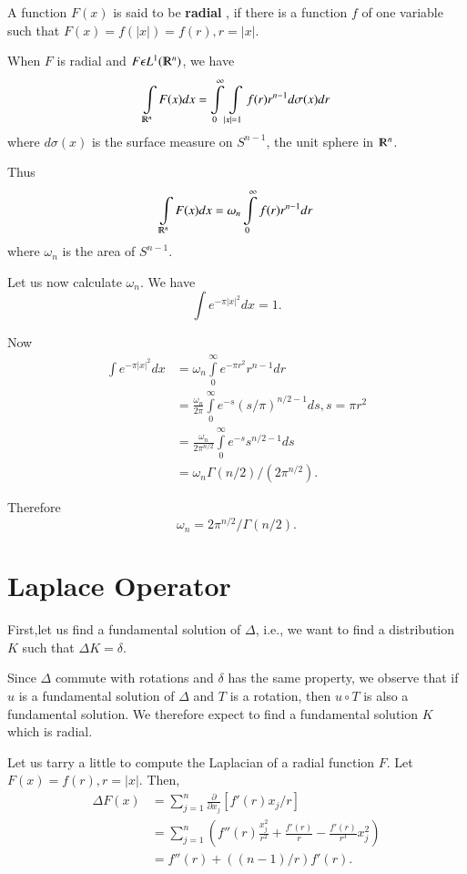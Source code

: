 \setcounter{defi}{14}
 \begin{defi} \label{chap2:sec3:def15}%
   A function $F(x)$ is said to be \textbf{ radial }, if there is a
   function $f$ of one variable such that $F(x) = f( |x|)= f(r), r =
   |x|$. 
 \end{defi} 

 When $F$ is radial and $F \epsilon L^{1}(\varmathbb{R}^n )$, we have
 $$
 \int\limits_{\varmathbb{R}^n}F(x) dx = \int\limits_{0}^{\infty}
 \int\limits_{| x | =1} f(r) r^{n-1}d \sigma(x) dr 
 $$
 where $d \sigma (x) $ is the surface measure on $S^{n-1}$, the unit
 sphere in $\varmathbb{R}^n$. 
 
 Thus
 $$
 \int\limits_{\varmathbb{R}^{n}} F(x) dx= \omega_n
 \int\limits_{0}^{\infty} f(r) r^{n-1} dr 
 $$
where $\omega_n$ is the area of $S^{n-1}$.
 
Let us now calculate $\omega_n $. We have
$$
\int\limits e^{- \pi |x|^2 } dx= 1.
$$ 
 
Now
\begin{align*} 
\int\limits e ^{- \pi |x|^2 } dx &= \omega_n \int\limits_{0}^{\infty}
e^{- \pi r ^{2}}r^{n-1}dr\\ 
&= \frac{\omega_{n}}{ 2 \pi} \int\limits_0 ^{\infty} e^{-s} (s/
\pi)^{n/2-1}ds, s = \pi r^2\\ 
&= \frac{\omega_{n}}{2 \pi ^{n/2}} \int\limits_0 ^{\infty} e^{-s} s^{n/2-1} ds\\
&=\omega_n \Gamma (n/2) / (2 \pi ^{n/2}).
\end{align*}

Therefore
$$
\omega _n = 2 \pi ^{n/2} / \Gamma(n/2).	 
$$

\section{Laplace Operator}\label{chap2:sec4} %

First,\pageoriginale let us find a fundamental solution of $ \Delta$,
i.e., we want to find a distribution $K$ such that $\Delta 	K = \delta$. 

Since $\Delta$ commute with rotations and $\delta$ has the same
property, we observe that if $u$ is a fundamental solution of $\Delta$
and $T$ is a rotation, then $u \circ T $ is also a fundamental
solution. We therefore expect to find a fundamental solution $K$ which
is radial. 

Let us tarry a little to compute the Laplacian of a radial function
$F$. Let$ F(x) = f(r), r = |x|$. Then,  
\begin{align*}
  \Delta F(x) &= \sum_{j=1}^n \frac{\partial}{\partial x _{j}} [f' (r) x_j /r]\\
  &= \sum_{j=1}^n \left(f''(r) \frac{x^{2}_{j}}{r^{2}} + \frac{f' (r)}{r}-
  \frac{f'(r)}{r^3} x^2_j\right)\\ 
  &= f''(r) + ((n-1)/r)f'(r).
\end{align*} 
 
